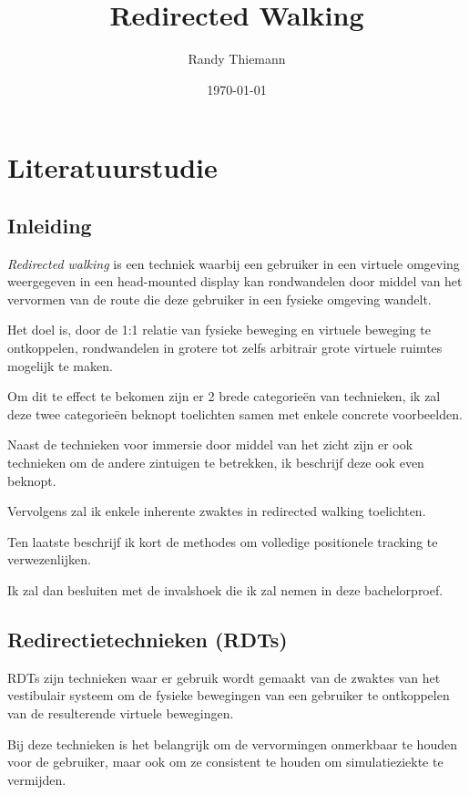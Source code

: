 \documentclass[a4paper,12pt]{article}
\begin{document}
\author{Randy Thiemann} 
\title{Redirected Walking} 
\date{\today} 
\maketitle

\section{Literatuurstudie}
\subsection{Inleiding}
\emph{Redirected walking} is een techniek waarbij een gebruiker in een virtuele
omgeving weergegeven in een head-mounted display kan rondwandelen door middel
van het vervormen van de route die deze gebruiker in een fysieke omgeving wandelt.

Het doel is, door de 1:1 relatie van fysieke beweging en virtuele beweging te
ontkoppelen, rondwandelen in grotere tot zelfs arbitrair grote virtuele ruimtes
mogelijk te maken.

Om dit te effect te bekomen zijn er 2 brede categorie\"en van technieken, ik zal
deze twee categorie\"en beknopt toelichten samen met enkele concrete voorbeelden.

Naast de technieken voor immersie door middel van het zicht zijn er ook 
technieken om de andere zintuigen te betrekken, ik beschrijf deze ook even 
beknopt.

Vervolgens zal ik enkele inherente zwaktes in redirected walking toelichten.

Ten laatste beschrijf ik kort de methodes om volledige positionele tracking te
verwezenlijken.

Ik zal dan besluiten met de invalshoek die ik zal nemen in deze bachelorproef.


\subsection{Redirectietechnieken (RDTs)}
RDTs zijn technieken waar er gebruik wordt gemaakt van de zwaktes van het 
vestibulair systeem om de fysieke bewegingen van een gebruiker te ontkoppelen
van de resulterende virtuele bewegingen.

Bij deze technieken is het belangrijk om de vervormingen onmerkbaar te houden
voor de gebruiker, maar ook om ze consistent te houden om simulatieziekte te
vermijden.\cite{kohn01}
\end{document}
